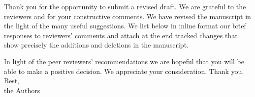 \noindent Thank you for the opportunity to submit a revised draft. We are grateful to the reviewers and for your constructive comments. We have revised the manuscript in the light of the many useful suggestions. We list below in inline format our brief responses to reviewers' comments and attach at the end tracked changes that show precisely the additions and deletions in the manuscript.

In light of the peer reviewers' recommendations we are hopeful that you will be able to make a positive decision.  We appreciate your consideration. Thank you.  
\\

\noindent Best,\\
the Authors 
\vspace{.5in}













